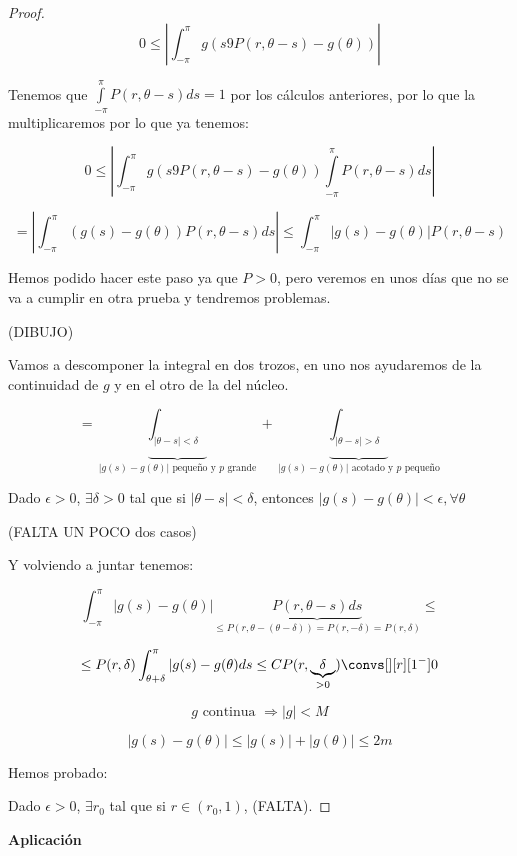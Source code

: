 			\begin{proof}

				\[0 \leq \left| \int_{-\pi}^{\pi} g(s9 P(r, \theta-s) - g(\theta))  \right| \]

				Tenemos que $\int\limits_{-\pi}^{\pi} P(r, \theta-s) ds = 1$ por los cálculos anteriores, por lo que la multiplicaremos por lo que ya tenemos:

				\[0 \leq \left| \int_{-\pi}^{\pi} g(s9 P(r, \theta-s) - g(\theta))  \int\limits_{-\pi}^{\pi} P(r, \theta-s) ds  \right| \]

				\[ = \left| \int_{-\pi}^\pi (g(s) - g(\theta)) P(r, \theta - s) ds \right|  \leq \int^{\pi}_{-\pi} | g(s) - g(\theta) | P(r, \theta- s) \]

				Hemos podido hacer este paso ya que $P>0$, pero veremos en unos días que no se va a cumplir en otra prueba y tendremos problemas.


				(DIBUJO)

				Vamos a descomponer la integral en dos trozos, en uno nos ayudaremos de la continuidad de $g$ y en el otro de la del núcleo.

				\[ = \underbrace{\int_{|\theta-s|< \delta}}_{|g(s) - g(\theta)| \text{ pequeño y }p\text{ grande}} + \underbrace{\int_{|\theta-s| > \delta}}_{|g(s) - g(\theta)| \text{ acotado y }p\text{ pequeño}} \]

				Dado $\epsilon > 0$, $\exists \delta > 0$ tal que si $|\theta-s| < \delta$, entonces $|g(s) - g(\theta)| < \epsilon, \forall \theta$

				(FALTA UN POCO dos casos)

				Y volviendo a juntar tenemos:

				\[ \int^{\pi}_{-\pi} |g(s) - g(\theta) | \underbrace{P(r, \theta-s) ds}_{\leq P(r, \theta-(\theta-\delta)) = P(r, -\delta) = P(r, \delta)} \leq   \]

				\[\leq P(r, \delta) \int^{\pi}_{\theta+\delta} |g(s) - g(\theta) ds \leq C P(r, \underbrace{\delta}_{> 0}) \convs[][r][1^-] 0  \]

				\[g \text{ continua } \Rightarrow |g| < M \]

				\[ |g(s)  - g(\theta)| \leq |g(s)| + | g(\theta) | \leq 2m \]


				Hemos probado:

				Dado $\epsilon > 0$, $\exists r_0$ tal que si $r \in (r_0,1)$, (FALTA).

			\end{proof}

		\textbf{Aplicación}

